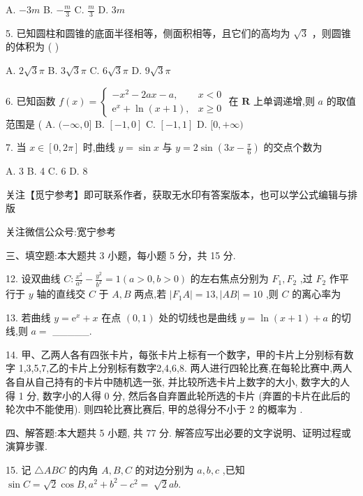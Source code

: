 \documentclass[10pt]{article}
\begin{document}
A. \(- {3m}\) B. \(- \frac{m}{3}\) C. \(\frac{m}{3}\) D. \({3m}\)

5. 已知圆柱和圆锥的底面半径相等，侧面积相等，且它们的高均为 \(\sqrt{3}\) ，则圆锥的体积为 ( )

A. \(2\sqrt{3}\pi\) B. \(3\sqrt{3}\pi\) C. \(6\sqrt{3}\pi\) D. \(9\sqrt{3}\pi\)

6. 已知函数 \(f\left( x\right)  = \left\{  \begin{array}{ll}  - {x}^{2} - {2ax} - a, & x < 0 \\  {\mathrm{e}}^{x} + \ln \left( {x + 1}\right) , & x \geq  0 \end{array}\right.\) 在 \(\mathbf{R}\) 上单调递增,则 \(a\) 的取值范围是 ( A. \(( - \infty ,0\rbrack\) B. \(\left\lbrack  {-1,0}\right\rbrack\) C. \(\left\lbrack  {-1,1}\right\rbrack\) D. \(\lbrack 0, + \infty )\)

7. 当 \(x \in  \left\lbrack  {0,{2\pi }}\right\rbrack\) 时,曲线 \(y = \sin x\) 与 \(y = 2\sin \left( {{3x} - \frac{\pi }{6}}\right)\) 的交点个数为

A. 3 B. 4 C. 6 D. 8

关注【觅宁参考】即可联系作者，获取无水印有答案版本，也可以学公式编辑与排版

关注微信公众号:宽宁参考

三、填空题:本大题共 3 小题，每小题 5 分，共 15 分.

12. 设双曲线 \(C : \frac{{x}^{2}}{{a}^{2}} - \frac{{y}^{2}}{{b}^{2}} = 1\left( {a > 0,b > 0}\right)\) 的左右焦点分别为 \({F}_{1},{F}_{2}\) ,过 \({F}_{2}\) 作平行于 \(y\) 轴的直线交 \(C\) 于 \(A,B\) 两点,若 \(\left| {{F}_{1}A}\right|  = {13},\left| {AB}\right|  = {10}\) ,则 \(C\) 的离心率为

13. 若曲线 \(y = {\mathrm{e}}^{x} + x\) 在点 \(\left( {0,1}\right)\) 处的切线也是曲线 \(y = \ln \left( {x + 1}\right)  + a\) 的切线,则 \(a =\) \_\_\_\_\_.

14. 甲、乙两人各有四张卡片，每张卡片上标有一个数字，甲的卡片上分别标有数字 1,3,5,7,乙的卡片上分别标有数字2,4,6,8. 两人进行四轮比赛,在每轮比赛中,两人各自从自己持有的卡片中随机选一张, 并比较所选卡片上数字的大小, 数字大的人得 1 分, 数字小的人得 0 分, 然后各自弃置此轮所选的卡片 (弃置的卡片在此后的轮次中不能使用). 则四轮比赛比赛后, 甲的总得分不小于 2 的概率为 .

四、解答题:本大题共 5 小题, 共 77 分. 解答应写出必要的文字说明、证明过程或演算步骤.

15. 记 \(\bigtriangleup {ABC}\) 的内角 \(A,B,C\) 的对边分别为 \(a,b,c\) ,已知 \(\sin C = \sqrt{2}\cos B,{a}^{2} + {b}^{2} - {c}^{2} = \; \sqrt{2}{ab}.\)
\end{document}
